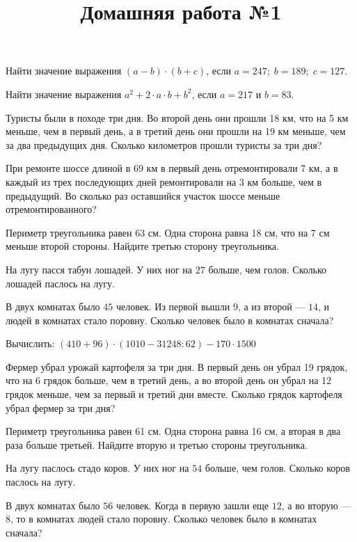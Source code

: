 \begin{listofex}
	\item Найти значение выражения \( (a-b)\cdot(b+c) \), если \( a=247;\; b=189;\; c=127 \).
	\item Найти значение выражения \( a^2+2\cdot a\cdot b + b^2 \), если \( a=217 \) и \( b=83 \).
	\item Туристы были в походе три дня. Во второй день они прошли 18 км, что на 5 км меньше,
	чем в первый день, а в третий день они прошли на 19 км меньше, чем за два предыдущих дня.
	Сколько километров прошли туристы за три дня?
	\item При ремонте шоссе длиной в 69 км в первый день отремонтировали 7 км, а в каждый из
	трех последующих дней ремонтировали на 3 км больше, чем в предыдущий. Во сколько раз
	оставшийся участок шоссе меньше отремонтированного?
	\item Периметр треугольника равен 63 см. Одна сторона равна 18 см, что на 7 см меньше второй стороны. Найдите третью сторону треугольника.
	\item На лугу пасся табун лошадей. У них ног на \( 27 \) больше, чем голов. Сколько лошадей паслось на лугу.
	\item В двух комнатах было \( 45 \) человек. Из первой вышли \( 9 \), а из второй --- \( 14 \), и людей в комнатах стало поровну. Сколько человек было в комнатах сначала?
\end{listofex}
\newpage
\title{Домашняя работа №1}
\begin{listofex}
	\item Вычислить: \( (410+96)\cdot(1010-31248:62)-170\cdot1500 \)
	\item Фермер убрал урожай картофеля за три дня. В первый день он убрал 19 грядок, что на 6 грядок больше, чем в третий день, а во второй день он убрал на 12 грядок меньше, чем за первый и третий дни вместе. Сколько грядок картофеля убрал фермер за три дня?
	\item Периметр треугольника равен 61 см. Одна сторона равна 16 см, а вторая в два раза больше третьей. Найдите вторую и третью стороны треугольника.
	\item На лугу паслось стадо коров. У них ног на \( 54 \) больше, чем голов. Сколько коров паслось на лугу.
	\item В двух комнатах было \( 56 \) человек. Когда в первую зашли еще \( 12 \), а во вторую --- \( 8 \), то в комнатах людей стало поровну. Сколько человек было в комнатах сначала?
\end{listofex}
\newpage

